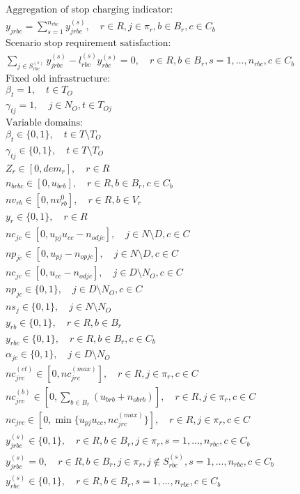 \documentclass[10pt]{article}
\begin{document}
\begin{align*}
&\text{Aggregation of stop charging indicator:} \\
& y_{jrbc} = \sum_{s=1}^{n_{rbc}} y^{(s)}_{jrbc}, \quad r \in R, j \in \pi_r, b \in B_r, c \in C_b \tag{43} \\
&\text{Scenario stop requirement satisfaction:} \\
& \sum_{j \in S^{(s)}_{rbc}} y^{(s)}_{jrbc} - l^{(s)}_{rbc} y^{(s)}_{rbc} = 0, \quad r \in R, b \in B_r, s = 1, \dots, n_{rbc}, c \in C_b \tag{44} \\
&\text{Fixed old infrastructure:} \\
& \beta_t = 1, \quad t \in T_O \tag{45} \\
& \gamma_{tj} = 1, \quad j \in N_O, t \in T_{Oj} \tag{46} \\
&\text{Variable domains:} \\
& \beta_t \in \{0, 1\}, \quad t \in T \setminus T_O \tag{47} \\
& \gamma_{tj} \in \{0, 1\}, \quad t \in T \setminus T_O \tag{48} \\
& Z_r \in [0, dem_r], \quad r \in R \tag{49} \\
& n_{brbc} \in [0, u_{brb}], \quad r \in R, b \in B_r, c \in C_b \tag{50} \\
& nv_{rb} \in [0, nv^0_{rb}], \quad r \in R, b \in V_r \tag{51} \\
& y_r \in \{0, 1\}, \quad r \in R \tag{52} \\
& nc_{jc} \in [0, u_{pj} u_{cc} - n_{odjc}], \quad j \in N \setminus D, c \in C \tag{53} \\
& np_{jc} \in [0, u_{pj} - n_{opjc}], \quad j \in N \setminus D, c \in C \tag{54} \\
& nc_{jc} \in [0, u_{cc} - n_{odjc}], \quad j \in D \setminus N_O, c \in C \tag{55} \\
& np_{jc} \in \{0, 1\}, \quad j \in D \setminus N_O, c \in C \tag{56} \\
& ns_j \in \{0, 1\}, \quad j \in N \setminus N_O \tag{57} \\
& y_{rb} \in \{0, 1\}, \quad r \in R, b \in B_r \tag{58} \\
& y_{rbc} \in \{0, 1\}, \quad r \in R, b \in B_r, c \in C_b \tag{59} \\
& \alpha_{jc} \in \{0, 1\}, \quad j \in D \setminus N_O \tag{60} \\
& nc^{(ct)}_{jrc} \in [0, nc^{(max)}_{jrc}], \quad r \in R, j \in \pi_r, c \in C \tag{61} \\
& nc^{(b)}_{jrc} \in [0, \sum_{b \in B_r} (u_{brb} + n_{obrb})], \quad r \in R, j \in \pi_r, c \in C \tag{62} \\
& nc_{jrc} \in [0, \min\{u_{pj} u_{cc}, nc^{(max)}_{jrc}\}], \quad r \in R, j \in \pi_r, c \in C \tag{63} \\
& y^{(s)}_{jrbc} \in \{0, 1\}, \quad r \in R, b \in B_r, j \in \pi_r, s = 1, \dots, n_{rbc}, c \in C_b \tag{64} \\
& y^{(s)}_{jrbc} = 0, \quad r \in R, b \in B_r, j \in \pi_r, j \notin S^{(s)}_{rbc}, s = 1, \dots, n_{rbc}, c \in C_b \tag{65} \\
& y^{(s)}_{rbc} \in \{0, 1\}, \quad r \in R, b \in B_r, s = 1, \dots, n_{rbc}, c \in C_b \tag{66}
\end{align*}
\end{document}
